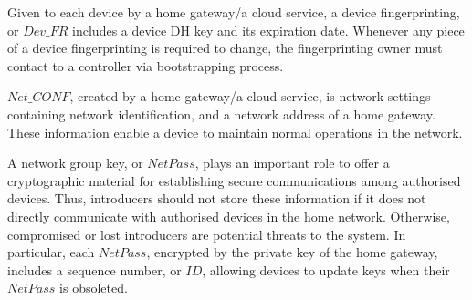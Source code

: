 Given to each device by a home gateway/a cloud service, a device fingerprinting, or $Dev\_FR$ includes a device DH key and its expiration date. Whenever any piece of a device fingerprinting is required to change, the fingerprinting owner must contact to a controller via bootstrapping process. 

$Net\_CONF$, created by a home gateway/a cloud service, is network settings containing network identification, and a network address of a home gateway. These information enable a device to maintain normal operations in the network. 

A network group key, or $NetPass$, plays an important role to offer a cryptographic material for establishing secure communications among authorised devices. Thus, introducers should not store these information if it does not directly communicate with authorised devices in the home network. Otherwise, compromised or lost introducers are potential threats to the system. In particular, each $NetPass$, encrypted by the private key of the home gateway, includes a sequence number, or $ID$, allowing devices to update keys when their $NetPass$ is obsoleted. 

